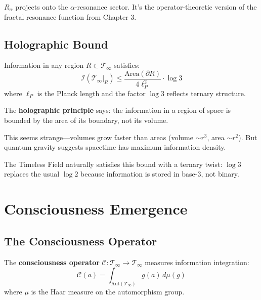 \begin{defn}
$R_\alpha$ projects onto the $\alpha$-resonance sector. It's the operator-theoretic version of the fractal resonance function from Chapter 3.

\subsection{Holographic Bound}

\begin{proposition}\label{prop:holographic}
Information in any region $R \subset \mathcal{T}_\infty$ satisfies:
\begin{equation}
\mathcal{I}(\mathcal{T}_\infty|_R) \leq \frac{\text{Area}(\partial R)}{4\ell_P^2} \cdot \log 3
\end{equation}
where $\ell_P$ is the Planck length and the factor $\log 3$ reflects ternary structure.
\end{proposition}

\begin{intuitive}
The \textbf{holographic principle}\cite{susskind_world_1995} says: the information in a region of space is bounded by the area of its boundary, not its volume.

This seems strange—volumes grow faster than areas (volume $\sim r^3$, area $\sim r^2$). But quantum gravity suggests spacetime has maximum information density.

The Timeless Field naturally satisfies this bound with a ternary twist: $\log 3$ replaces the usual $\log 2$ because information is stored in base-3, not binary.
\end{intuitive}

\section{Consciousness Emergence}
\label{sec:consciousness-emergence}

\subsection{The Consciousness Operator}

\begin{defn}\label{def:consciousness-operator}
The \textbf{consciousness operator} $\mathcal{C}: \mathcal{T}_\infty \to \mathcal{T}_\infty$ measures information integration:
\begin{equation}
\mathcal{C}(a) = \int_{\text{Aut}(\mathcal{T}_\infty)} g(a) \, d\mu(g)
\end{equation}
where $\mu$ is the Haar measure on the automorphism group.
\end{defn}


\end{defn}
